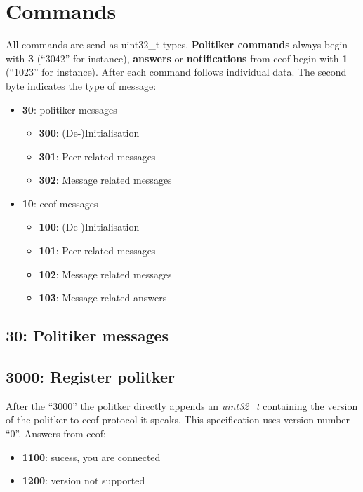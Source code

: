 \documentclass[12pt,a4paper]{book}
\begin{document}
\section{Commands}
All commands are send as uint32\_t types.
\textbf{Politiker commands} always begin with
\textbf{3} ("`3042"' for instance),
\textbf{answers} or \textbf{notifications} from
ceof begin with \textbf{1} ("`1023"' for instance).
After each command follows individual data. The second byte indicates the type of message:
\begin{itemize}
\item \textbf{30}: politiker messages
\begin{itemize}
\item \textbf{300}: (De-)Initialisation
\item \textbf{301}: Peer related messages
\item \textbf{302}: Message related messages
\end{itemize}
\item \textbf{10}: ceof messages
\begin{itemize}
\item \textbf{100}: (De-)Initialisation
\item \textbf{101}: Peer related messages
\item \textbf{102}: Message related messages
\item \textbf{103}: Message related answers
\end{itemize}
\end{itemize}

\subsection{30: Politiker messages}
\subsection{3000: Register politker}
After the "`3000"' the politker directly appends an
\textit{uint32\_t} containing the version of the politker to ceof protocol
it speaks. This specification uses version number "`0"'.
Answers from ceof:
\begin{itemize}
\item \textbf{1100}: sucess, you are connected
\item \textbf{1200}: version not supported
\end{itemize}
\end{document}
